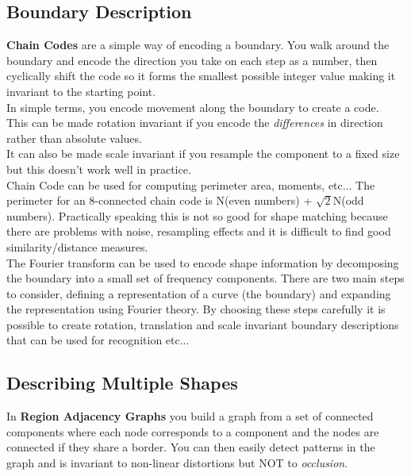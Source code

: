 \documentclass{article}
\begin{document}
	\subsection{Boundary Description}
	\textbf{Chain Codes} are a simple way of encoding a boundary. You walk around the boundary and encode the direction you take on each step as a number, then cyclically shift the code so it forms the smallest possible integer value making it invariant to the starting point.\\
	In simple terms, you encode movement along the boundary to create a code.\\
	This can be made rotation invariant if you encode the \textit{differences} in direction rather than absolute values.\\
	It can also be made scale invariant if you resample the component to a fixed size but this doesn't work well in practice.\\
	Chain Code can be used for computing perimeter area, moments, etc... The perimeter for an 8-connected chain code is N(even numbers) + $\sqrt{2}$N(odd numbers). Practically speaking this is not so good for shape matching because there are problems with noise, resampling effects and it is difficult to find good similarity/distance measures.\\
	The Fourier transform can be used to encode shape information by decomposing the boundary into a small set of frequency components. There are two main steps to consider, defining a representation of a curve (the boundary) and expanding the representation using Fourier theory. By choosing these steps carefully it is possible to create rotation, translation and scale invariant boundary descriptions that can be used for recognition etc...
	\subsection{Describing Multiple Shapes}
	In \textbf{Region Adjacency Graphs} you build a graph from a set of connected components where each node corresponds to a component and the nodes are connected if they share a border. You can then easily detect patterns in the graph and is invariant to non-linear distortions but NOT  to \textit{occlusion}.
\end{document}

